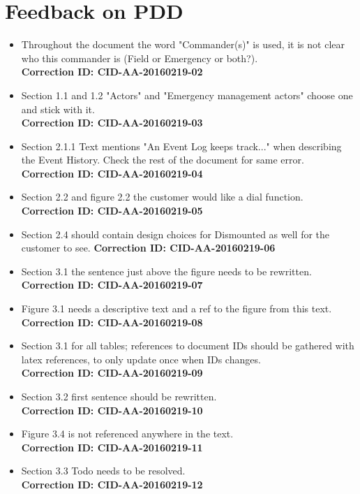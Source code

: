 \newpage
\section*{Feedback on PDD}
\begin{itemize}
    \item Throughout the document the word "Commander(s)" is used, it is not clear who this commander is (Field or Emergency or both?).\\ \textbf{Correction ID: CID-AA-20160219-02}
    \item Section 1.1 and 1.2 "Actors" and "Emergency management actors" choose one and stick with it.\\ \textbf{Correction ID: CID-AA-20160219-03}
    \item Section 2.1.1 Text mentions "An Event Log keeps track..." when describing the Event History. Check the rest of the document for same error.\\ \textbf{Correction ID: CID-AA-20160219-04}
    \item Section 2.2 and figure 2.2 the customer would like a dial function. \\ \textbf{Correction ID: CID-AA-20160219-05}
    \item Section 2.4 should contain design choices for Dismounted as well for the customer to see. \textbf{Correction ID: CID-AA-20160219-06}
    \item Section 3.1 the sentence just above the figure needs to be rewritten. \\ \textbf{Correction ID: CID-AA-20160219-07}
    \item Figure 3.1 needs a descriptive text and a ref to the figure from this text.\\ \textbf{Correction ID: CID-AA-20160219-08}
    \item Section 3.1 for all tables; references to document IDs should be gathered with latex references, to only update once when IDs changes.\\ \textbf{Correction ID: CID-AA-20160219-09}
    \item Section 3.2 first sentence should be rewritten.\\ \textbf{Correction ID: CID-AA-20160219-10}
    \item Figure 3.4 is not referenced anywhere in the text.\\ \textbf{Correction ID: CID-AA-20160219-11}
    \item Section 3.3 Todo needs to be resolved.\\ \textbf{Correction ID: CID-AA-20160219-12}
\end{itemize}

